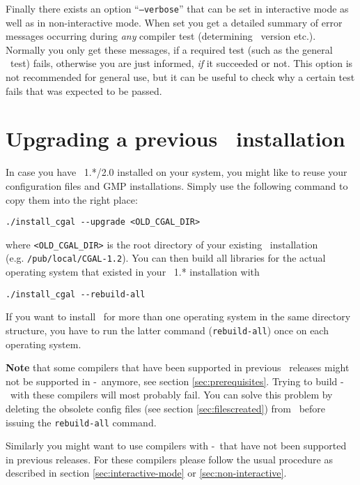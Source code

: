 Finally there exists an option ``\texttt{--verbose}'' that can be set
in interactive mode as well as in non-interactive mode. When set you
get a detailed summary of error messages occurring during \textit{any}
compiler test (determining \stl\ version etc.). Normally you only get
these messages, if a required test (such as the general \stl\ test)
fails, otherwise you are just informed, \textit{if} it succeeded or
not.  This option is not recommended for general use, but it can be
useful to check why a certain test fails that was expected to be
passed.

\section{Upgrading a previous \cgal\ installation}\label{sec:upgrade}

In case you have \cgal\ 1.*/2.0 installed on your system, you might
like to reuse your configuration files and GMP installations. Simply
use the following command to copy them into the right place:
\begin{verbatim}
./install_cgal --upgrade <OLD_CGAL_DIR>
\end{verbatim}
where \texttt{<OLD\_CGAL\_DIR>} is the root directory of your existing
\cgal\ installation\\ (e.g. \texttt{/pub/local/CGAL-1.2}).
You can then build all libraries for the actual operating system that
existed in your \cgal\ 1.* installation with 
\begin{verbatim}
./install_cgal --rebuild-all
\end{verbatim}

If you want to install \cgal\ for more than one operating system in
the same directory structure, you have to run the latter command
(\texttt{rebuild-all}) once on each operating system.

\textbf{Note} that some compilers that have been supported in previous
\cgal\ releases might not be supported in \cgal-\cgalrelease\ anymore,
see section \ref{sec:prerequisites}. Trying to build
\cgal-\cgalrelease\ with these compilers will most probably fail. You
can solve this problem by deleting the obsolete config files (see
section \ref{sec:filescreated}) from \cgalinstconfdir\ before issuing
the \texttt{rebuild-all} command.

Similarly you might want to use compilers with \cgal-\cgalrelease\ 
that have not been supported in previous releases. For these compilers
please follow the usual procedure as described in section
\ref{sec:interactive-mode} or \ref{sec:non-interactive}.


